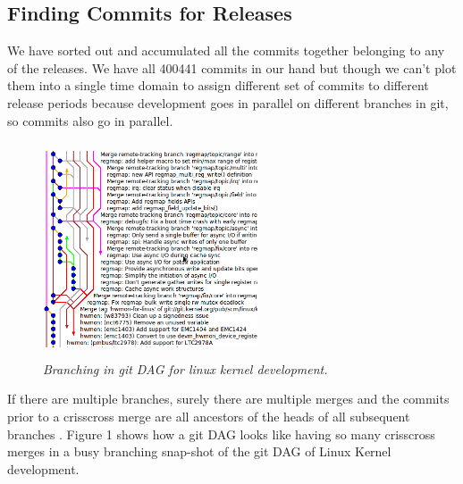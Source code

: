 \documentclass{acm_proc_article-sp}
\begin{document}
\subsection{Finding Commits for Releases}
We have sorted out and accumulated all the commits together belonging to any of the releases. We have all 400441 commits in our hand but though we can't plot them into a single time domain to assign different set of commits to different release periods because development goes in parallel on different branches in git, so commits also go in parallel.
\begin{figure}
\begin{center}
\includegraphics[height=2.5in,width=2.5in]{gitdag.png}
\caption{\small \sl Branching in git DAG for linux kernel development.}
\end{center}
\end{figure}
If there are multiple branches, surely there are multiple merges and the commits prior to a crisscross merge are all ancestors of the heads of all subsequent branches \cite{bird_git}. Figure 1 shows how a git DAG looks like having so many crisscross merges in a busy branching snap-shot of the git DAG of Linux Kernel development.
\end{document}
